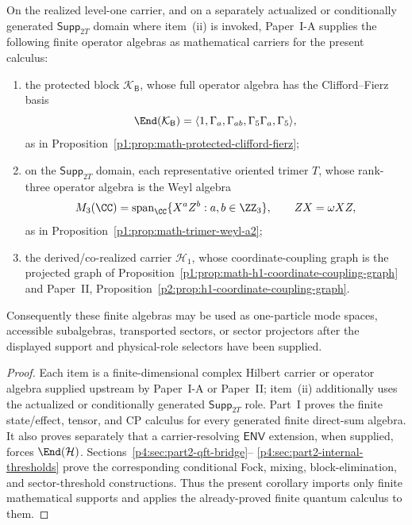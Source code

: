 \documentclass[12pt,a4paper]{article}
\begin{document}
\begin{corollary}
\label{p4:cor:hurwitz-finite-operator-algebras}
On the realized level-one carrier, and on a separately actualized or
conditionally generated \(\mathsf{Supp}_{2T}\) domain where item~(ii) is
invoked, Paper~I-A
supplies the following finite operator algebras as mathematical carriers for
the present calculus:
\begin{enumerate}[label=(\roman*), leftmargin=2em]
\item the protected block \(\mathcal K_{\mathsf B}\), whose full operator algebra has the Clifford--Fierz basis
\[
\End(\mathcal K_{\mathsf B})
=
\langle 1,\Gamma_a,\Gamma_{ab},\Gamma_5\Gamma_a,\Gamma_5\rangle,
\]
as in Proposition~\ref{p1:prop:math-protected-clifford-fierz};
\item on the \(\mathsf{Supp}_{2T}\) domain, each representative oriented
trimer \(T\),
whose rank-three operator algebra is the Weyl algebra
\[
M_3(\CC)=\operatorname{span}_{\CC}\{X^aZ^b:a,b\in\ZZ_3\},
\qquad
ZX=\omega XZ,
\]
as in Proposition~\ref{p1:prop:math-trimer-weyl-a2};
\item the derived/co-realized carrier \(\mathcal H_1\), whose coordinate-coupling graph is the projected graph of Proposition~\ref{p1:prop:math-h1-coordinate-coupling-graph} and Paper~II, Proposition~\ref{p2:prop:h1-coordinate-coupling-graph}.
\end{enumerate}
Consequently these finite algebras may be used as one-particle mode spaces,
accessible subalgebras, transported sectors, or sector projectors after the
displayed support and physical-role selectors have been supplied.
\end{corollary}


\begin{proof}
Each item is a finite-dimensional complex Hilbert carrier or operator algebra
supplied upstream by Paper~I-A or Paper~II; item~(ii) additionally uses the
actualized or conditionally generated \(\mathsf{Supp}_{2T}\) role.
Part~I proves the finite state/effect, tensor, and CP calculus for every
generated finite direct-sum algebra.  It also proves separately that a
carrier-resolving \(\mathsf{ENV}\) extension, when supplied, forces
\(\End(\mathcal H)\).  Sections~\ref{p4:sec:part2-qft-bridge}--
\ref{p4:sec:part2-internal-thresholds} prove the corresponding conditional
Fock, mixing, block-elimination, and sector-threshold constructions.
Thus the present corollary imports only finite mathematical supports and applies the already-proved finite quantum calculus to them.
\end{proof}
\end{document}
